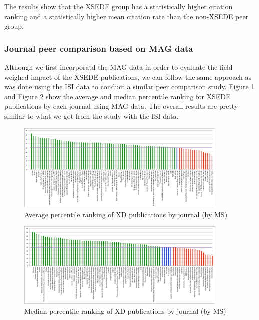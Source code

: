 \documentclass{sig-alternate}
\begin{document}
The results show that the XSEDE group has a statistically higher citation ranking and a
statistically higher mean citation rate than the non-XSEDE peer group.

\subsubsection{Journal peer comparison based on MAG data}

Although we first incorporatd the MAG data in order to evaluate the field weighed impact
of the XSEDE publications, we can follow the same approach as was done using the ISI data to conduct
a similar peer comparison study. Figure \ref{F:ms_peers_byj_mean} and Figure \ref{F:ms_peers_byj_median}
show the average and median percentile ranking for XSEDE publications by each journal using
MAG data. The overall results are pretty similar to what we got from the study with the ISI data.

\begin{figure}[htb!]
  \centering
    \includegraphics[width=0.9\textwidth]{images/ms_peers_byj_mean_10.pdf}
    \caption{Average percentile ranking of XD publications by journal (by MS)}
    \label{F:ms_peers_byj_mean}
\end{figure}

\begin{figure}[htb!]
  \centering
    \includegraphics[width=0.9\textwidth]{images/ms_peers_byj_median_10.pdf}
    \caption{Median percentile ranking of XD publications by journal (by MS)}
    \label{F:ms_peers_byj_median}
\end{figure}
\end{document}
